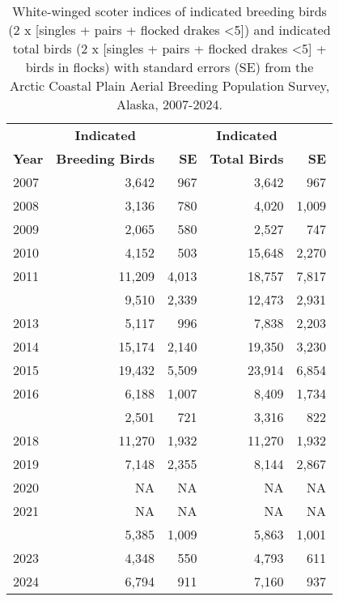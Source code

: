 \documentclass[
]{article}
\begin{document}
\begingroup\fontsize{10}{12}\selectfont

\begin{longtable}[t]{lrrrr}

\caption{\label{tbl-WWSC}White-winged scoter indices of indicated
breeding birds (2 x {[}singles + pairs + flocked drakes \textless5{]})
and indicated total birds (2 x {[}singles + pairs + flocked drakes
\textless5{]} + birds in flocks) with standard errors (SE) from the
Arctic Coastal Plain Aerial Breeding Population Survey, Alaska,
2007-2024.}

\tabularnewline

\\
\toprule
\multicolumn{1}{c}{\textbf{ }} & \multicolumn{1}{c}{\textbf{Indicated}} & \multicolumn{1}{c}{\textbf{ }} & \multicolumn{1}{c}{\textbf{Indicated}} & \multicolumn{1}{c}{\textbf{ }} \\
\cmidrule(l{3pt}r{3pt}){2-2} \cmidrule(l{3pt}r{3pt}){4-4}
\textbf{Year} & \textbf{Breeding Birds} & \textbf{SE} & \textbf{Total Birds} & \textbf{SE}\\
\midrule
2007 & 3,642 & 967 & 3,642 & 967\\
2008 & 3,136 & 780 & 4,020 & 1,009\\
2009 & 2,065 & 580 & 2,527 & 747\\
2010 & 4,152 & 503 & 15,648 & 2,270\\
2011 & 11,209 & 4,013 & 18,757 & 7,817\\
\addlinespace
2012 & 9,510 & 2,339 & 12,473 & 2,931\\
2013 & 5,117 & 996 & 7,838 & 2,203\\
2014 & 15,174 & 2,140 & 19,350 & 3,230\\
2015 & 19,432 & 5,509 & 23,914 & 6,854\\
2016 & 6,188 & 1,007 & 8,409 & 1,734\\
\addlinespace
2017 & 2,501 & 721 & 3,316 & 822\\
2018 & 11,270 & 1,932 & 11,270 & 1,932\\
2019 & 7,148 & 2,355 & 8,144 & 2,867\\
2020 & NA & NA & NA & NA\\
2021 & NA & NA & NA & NA\\
\addlinespace
2022 & 5,385 & 1,009 & 5,863 & 1,001\\
2023 & 4,348 & 550 & 4,793 & 611\\
2024 & 6,794 & 911 & 7,160 & 937\\
\bottomrule

\end{longtable}
\end{document}
